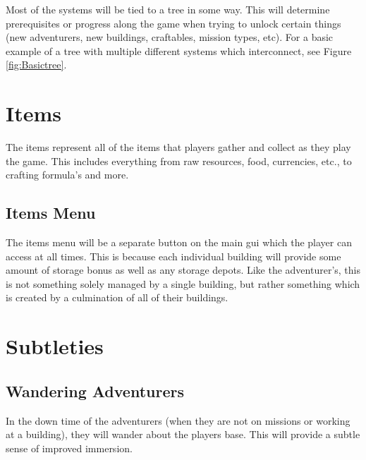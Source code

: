 Most of the systems will be tied to a tree in some way. This will determine prerequisites or progress along the game when trying to unlock certain things (new adventurers, new buildings, craftables, mission types, etc). For a basic example of a tree with multiple different systems which interconnect, see Figure \ref{fig:Basictree}.








\section{Items}

The items represent all of the items that players gather and collect as they play the game. This includes everything from raw resources, food, currencies, etc., to crafting formula's and more.

\subsection{Items Menu}

The items menu will be a separate button on the main gui which the player can access at all times. This is because each individual building will provide some amount of storage bonus as well as any storage depots. Like the adventurer's, this is not something solely managed by a single building, but rather something which is created by a culmination of all of their buildings.





\section{Subtleties}

\subsection{Wandering Adventurers}

In the down time of the adventurers (when they are not on missions or working at a building), they will wander about the players base. This will provide a subtle sense of improved immersion. 

